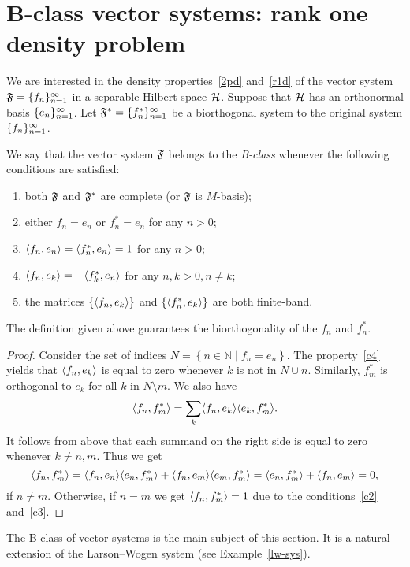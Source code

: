 \documentclass[12pt]{amsart}
\begin{document}
\section{B-class vector systems: rank one density problem}
    \label{fsys2graphs}
    We are interested in the density properties~\ref{2pd} and~\ref{r1d} of the vector system $\fsys = \seq{f}$
      in a separable Hilbert space $\cal{H}$.
    Suppose that $\cal{H}$ has an orthonormal basis $\seq{e}$.
    Let $\fstarsys = \{f_n^{*}\}_{n=1}^\infty$ be a biorthogonal system to the original system $\seq{f}$.
    \begin{definition}
      We say that the vector system $\fsys$ belongs to the \emph{B-class} whenever the following conditions are satisfied:
      \begin{enumerate}[label=\textbf{C\arabic*}]
        \item \label{c1} both $\fsys$ and $\fstarsys$ are complete (or $\fsys$ is $M$-basis);
        \item \label{c2} either $f_n = e_n$ or $f^*_n = e_n$ for any $n > 0$;
        \item \label{c3} $\inner{f_n}{e_n} = \inner{f^*_n}{e_n} = 1$ for any $n > 0$;
        \item \label{c4} $\inner{f_n}{e_k} = -\inner{f^*_k}{e_n}$ for any $n, k > 0, n \neq k$;
        \item \label{c5} the matrices $\{\inner{f_n}{e_k}\}$ and $\{\inner{f^*_n}{e_k}\}$ are both finite-band.
      \end{enumerate}
    \end{definition}
    \begin{prop}
      The definition given above guarantees the biorthogonality of the $f_n$ and $f^*_n$.
    \end{prop}
    \begin{proof}
      Consider the set of indices $N = \left\{n \in \mathbb{N} \mid f_n = e_n \right\}$.
      The property~\ref{c4} yields that $\inner{f_n}{e_k}$ is equal to zero whenever $k$ is not in
        $N \cup {n}$.
      Similarly, $f^*_m$ is orthogonal to $e_k$ for all $k$ in $N \setminus {m}$.
      We also have
      \[
        \inner{f_n}{f^*_m} = \sum_{k} \inner{f_n}{e_k} \inner{e_k}{f^*_m}.
      \]
      It follows from above that each summand on the right side is equal to zero whenever $k \neq n, m$.
      Thus we get
      \[
        \inner{f_n}{f^*_m} = \inner{f_n}{e_n} \inner{e_n}{f^*_m} + \inner{f_n}{e_m} \inner{e_m}{f^*_m}
        = \inner{e_n}{f^*_m} + \inner{f_n}{e_m} = 0,
      \]
      if $n \neq m$.
      Otherwise, if $n = m$ we get $\inner{f_n}{f^*_m} = 1$ due to the conditions~\ref{c2} and~\ref{c3}.
    \end{proof}
    The B-class of vector systems is the main subject of this section.
    It is a natural extension of the Larson--Wogen system (see Example~\ref{lw-sys}).
\end{document}

